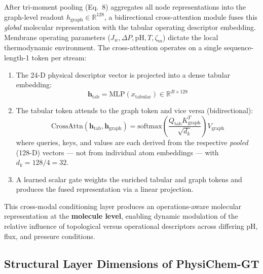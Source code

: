 \documentclass[11pt]{article}
\begin{document}
After tri-moment pooling (Eq.~8) aggregates all node representations into the graph-level readout $h_{\mathrm{graph}} \in \mathbb{R}^{128}$, a bidirectional cross-attention module fuses this \emph{global} molecular representation with the tabular operating descriptor embedding. Membrane operating parameters ($J_w, \Delta P, \mathrm{pH}, T, \zeta_m$) dictate the local thermodynamic environment. The cross-attention operates on a single sequence-length-1 token per stream:
\begin{enumerate}[leftmargin=1.0cm]
    \item The 24-D physical descriptor vector is projected into a dense tabular embedding:
    \begin{equation}
    \mathbf{h}_{\mathrm{tab}} = \mathrm{MLP}(x_{\mathrm{tabular}}) \in \mathbb{R}^{B \times 128}
    \end{equation}
    \item The tabular token attends to the graph token and vice versa (bidirectional):
    \begin{equation}
    \mathrm{CrossAttn}(\mathbf{h}_{\mathrm{tab}}, \mathbf{h}_{\mathrm{graph}}) = \mathrm{softmax}\!\left( \frac{Q_{\mathrm{tab}} K_{\mathrm{graph}}^T}{\sqrt{d_k}} \right) V_{\mathrm{graph}}
    \label{eq:s_cross_attn}
    \end{equation}
    where queries, keys, and values are each derived from the respective \emph{pooled} (128-D) vectors — not from individual atom embeddings — with $d_k = 128/4 = 32$.
    \item A learned scalar gate weights the enriched tabular and graph tokens and produces the fused representation via a linear projection.
\end{enumerate}
This cross-modal conditioning layer produces an operations-aware molecular representation at the \textbf{molecule level}, enabling dynamic modulation of the relative influence of topological versus operational descriptors across differing pH, flux, and pressure conditions.

\subsection{Structural Layer Dimensions of PhysiChem-GT}
\end{document}
